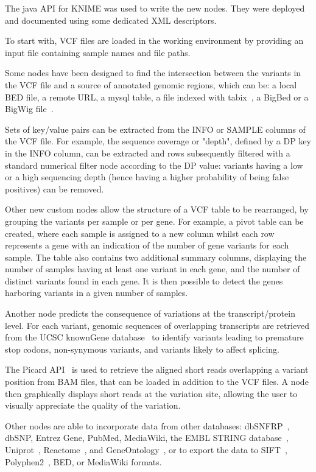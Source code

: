 \documentclass{bioinfo}
\begin{document}
The java API for KNIME was used to write the new nodes. They were deployed and documented using some dedicated XML descriptors.

To start with, VCF files are loaded in the working environment by providing an input file containing sample names and file paths.

Some nodes have been designed to find the intersection between the variants in the VCF file and a source of annotated genomic regions, which can be: a local BED file, a remote URL, a mysql table, a file indexed with tabix~\citep{pmid21208982}, a BigBed or a BigWig file~\citep{pmid20639541}.


Sets of key/value pairs can be extracted from the INFO or SAMPLE columns of the VCF file. For example, the sequence coverage or "depth", defined by a DP key in the INFO column, can be extracted and rows subsequently filtered with a standard numerical filter node according to the DP value: variants having a low or a high sequencing depth (hence having a higher probability of being false positives) can be removed.


Other new custom nodes allow the structure of a VCF table to be rearranged, by grouping the variants per sample or per gene. For example, a pivot table can be created, where each sample is assigned to a new column whilst each row represents a gene with an indication of the number of gene variants for each sample. The table also contains two additional summary columns, displaying the number of samples having at least one variant in each gene, and the number of distinct variants found in each gene. It is then possible to detect the genes harboring variants in a given number of samples.

Another node predicts the consequence of variations at the transcript/protein level. For each variant, genomic sequences of overlapping transcripts are retrieved from the UCSC knownGene database~\citep{pmid16500937} to identify variants leading to premature stop codons, non-synymous variants, and variants likely to affect splicing.

The Picard API~\citep{pmid19505943} is used to retrieve the aligned short reads overlapping a variant position from BAM files, that can be loaded in addition to the VCF files. A node then graphically displays short reads at the variation site, allowing the user to visually appreciate the quality of the variation.

Other nodes are able to incorporate data from other databases: dbSNFRP~\citep{pmid21520341}, dbSNP, Entrez Gene, PubMed, MediaWiki, the EMBL STRING database~\citep{pmid17098935}, Uniprot~\citep{pmid21447597}, Reactome~\citep{pmid21067998}, and GeneOntology~\citep{pmid18957448}, or to export the data to SIFT~\citep{pmid11337480}, Polyphen2~\citep{pmid20354512}, BED, or MediaWiki formats.
\end{document}
